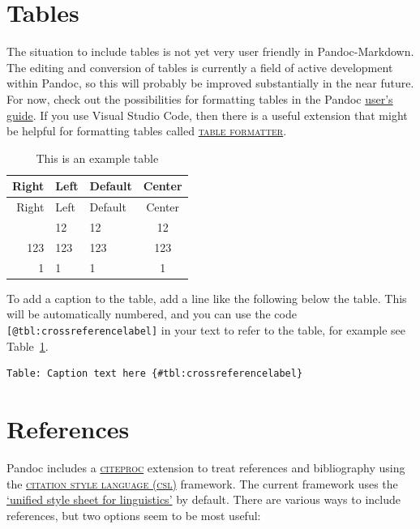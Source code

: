 \hypertarget{tables}{%
\section{Tables}\label{tables}}

The\paragraphnumber{[2.10]} situation to include tables is not yet very
user friendly in Pandoc-Markdown. The editing and conversion of tables
is currently a field of active development within Pandoc, so this will
probably be improved substantially in the near future. For now, check
out the possibilities for formatting tables in the Pandoc
\href{https://pandoc.org/MANUAL.html\#tables}{user's guide}. If you use
Visual Studio Code, then there is a useful extension that might be
helpful for formatting tables called
\href{https://marketplace.visualstudio.com/items?itemName=shuworks.vscode-table-formatter}{\textsc{table
formatter}}.

\hypertarget{tbl:crossreferencelabel}{}
\begin{longtable}[]{@{}rllc@{}}
\caption{\label{tbl:crossreferencelabel}This is an example
table}\tabularnewline
\toprule\noalign{}
Right & Left & Default & Center \\
\midrule\noalign{}
\endfirsthead
\toprule\noalign{}
Right & Left & Default & Center \\
\midrule\noalign{}
\endhead
\bottomrule\noalign{}
\endlastfoot
12 & 12 & 12 & 12 \\
123 & 123 & 123 & 123 \\
1 & 1 & 1 & 1 \\
\end{longtable}

To\paragraphnumber{[2.11]} add a caption to the table, add a line like
the following below the table. This will be automatically numbered, and
you can use the code \texttt{{[}@tbl:crossreferencelabel{]}} in your
text to refer to the table, for example see
Table~\ref{tbl:crossreferencelabel}.

\begin{verbatim}
Table: Caption text here {#tbl:crossreferencelabel}
\end{verbatim}

\hypertarget{sec:references}{%
\section{References}\label{sec:references}}

Pandoc\paragraphnumber{[2.12]} includes a
\href{https://pandoc.org/MANUAL.html\#citations}{\textsc{citeproc}}
extension to treat references and bibliography using the
\href{https://citationstyles.org}{\textsc{citation style language
(csl)}} framework. The current framework uses the
\href{https://www.zotero.org/styles?q=linguistics}{`unified style sheet
for linguistics'} by default. There are various ways to include
references, but two options seem to be most useful:

